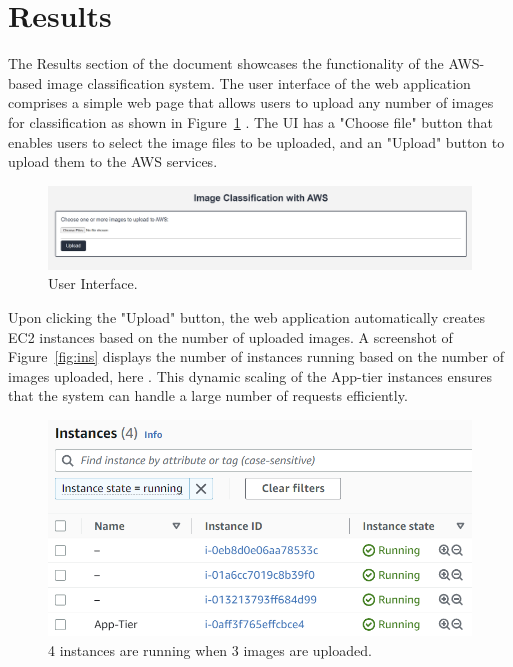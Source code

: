 \documentclass[../main.tex]{subfiles}
\begin{document}
\part*{Results}

The Results section of the document showcases the functionality of the AWS-based image classification system. The user interface of the web application comprises a simple web page that allows users to upload any number of images for classification as shown in Figure~\ref{fig:ui} . The UI has a "Choose file" button that enables users to select the image files to be uploaded, and an "Upload" button to upload them to the AWS services.
\begin{figure}[h!]
\centering
\includegraphics[scale=0.36]{images/ui.png}
\caption{User Interface.}
\label{fig:ui}
\end{figure}

Upon clicking the "Upload" button, the web application automatically creates EC2 instances based on the number of uploaded images. A screenshot of Figure~\ref{fig:ins} displays the number of instances running based on the number of images uploaded, here . This dynamic scaling of the App-tier instances ensures that the system can handle a large number of requests efficiently.
\begin{figure}[h!]
\centering
\includegraphics[scale=0.7]{images/ins.png}
\caption{4 instances are running when 3 images are uploaded.}
\label{fig:op}
\end{figure}
\end{document}

